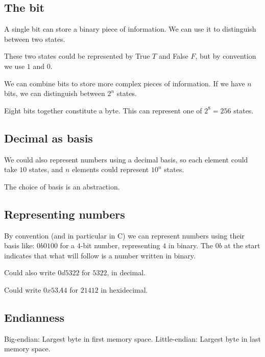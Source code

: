 
\subsection{The bit}

A single bit can store a binary piece of information. We can use it to distinguish between two states.

These two states could be represented by True \(T\) and False \(F\), but by convention we use \(1\) and \(0\).

We can combine bits to store more complex pieces of information. If we have \(n\) bits, we can distinguish between \(2^n\) states.

Eight bits together constitute a byte. This can represent one of \(2^8=256\) states.

\subsection{Decimal as basis}

We could also represent numbers using a decimal basis, so each element could take \(10\) states, and \(n\) elements could represent \(10^n\) states.

The choice of basis is an abstraction.

\subsection{Representing numbers}

By convention (and in particular in C) we can represent numbers using their basis like: \(0b0100\) for a \(4\)-bit number, representing \(4\) in binary. The \(0b\) at the start indicates that what will follow is a number written in binary.

Could also write \(0d5322\) for \(5322\), in decimal.

Could write \(0x53A4\) for \(21412\) in hexidecimal.

\subsection{Endianness}

Big-endian: Largest byte in first memory space.
Little-endian: Largest byte in last memory space.

